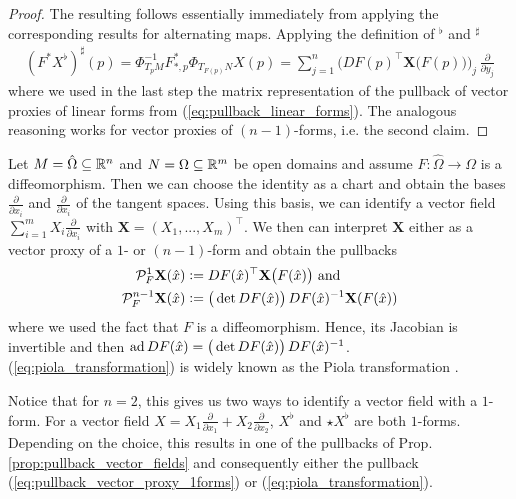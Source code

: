 \documentclass[../master_thesis.tex]{subfiles}
\begin{document}
\begin{proof}
    The resulting follows essentially immediately from applying the 
    corresponding results for alternating maps. Applying the definition of 
    $^\flat$ and $^\sharp$
    \begin{align*}
        (F^* X^\flat)^\sharp(p)
        = \Phi^{-1}_{T_p M} F_{*,p}^* \Phi_{T_{F(p)}N} X(p)
        = \sum_{j=1}^n \Big( DF(p)^\top \mathbf{X}\big( F(p) \big) \Big)_j \,\frac{\partial}{\partial y_j}
    \end{align*}
    where we used in the last step the matrix representation of the pullback of vector proxies
    of linear forms from (\ref{eq:pullback_linear_forms}). The analogous reasoning works 
    for vector proxies of $(n-1)$-forms, i.e. the second claim.
\end{proof}

Let $M = \hat{\Omega} \subseteq \mathbb{R}^n$ and $N = \Omega \subseteq \mathbb{R}^m$ be open domains and assume 
$F: \hat{\Omega} \rightarrow \Omega$ is a diffeomorphism. Then we can choose the identity as a chart and obtain 
the bases $\frac{\partial}{\partial \hat{x}_i}$ and $\frac{\partial}{\partial x_i}$ of the tangent spaces.
Using this basis, we 
can identify a vector field $\sum_{i=1}^m X_i \frac{\partial}{\partial x_i}$
with $\mathbf{X} = (X_1,...,X_m)^\top$. We then can interpret $\mathbf{X}$ 
either as a vector proxy of a $1$- or $(n-1)$-form and obtain the pullbacks
\begin{align}
    \mathcal{P}^1_F \mathbf{X}(\hat{x}) &\vcentcolon= DF(\hat{x})^\top \mathbf{X}\big(F(\hat{x}) \big) 
    \text{ and} \label{eq:pullback_vector_proxy_1forms}
    \\ \mathcal{P}^{n-1}_F \mathbf{X}(\hat{x}) &\vcentcolon= \big(\det DF(\hat{x})\big)\,
        DF(\hat{x})^{-1} \mathbf{X}(F(\hat{x}))\label{eq:piola_transformation}
\end{align}
where we used the fact that $F$ is a diffeomorphism. Hence, its Jacobian 
is invertible and then $\operatorname{ad} DF(\hat{x}) = \big(\det DF(\hat{x})\big)\,
DF(\hat{x})^{-1}$.
(\ref{eq:piola_transformation}) is widely known as the Piola transformation \cite[Def.\,9.8]{ern_guermond}.

\begin{remark}\label{rem:vector_proxies_differential_forms_2d}
    Notice that for $n=2$, this gives us two ways to identify a vector field with a $1$-form. 
    For a vector field $X = X_1 \frac{\partial}{\partial x_1} + X_2 \frac{\partial}{\partial x_2}$, 
    $X^\flat$ and $\star X^\flat$ are both $1$-forms. 
    Depending on the choice, this results in one of the pullbacks of 
    Prop.\,\ref{prop:pullback_vector_fields} and consequently either the pullback 
    (\ref{eq:pullback_vector_proxy_1forms}) or (\ref{eq:piola_transformation}).
\end{remark}
\end{document}
